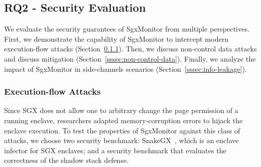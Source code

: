 \subsection{RQ2 - Security Evaluation}
\label{ssec:security-properties}

We evaluate the security guarantees of SgxMonitor from multiple 
perspectives.
First, we demonstrate the capability of SgxMonitor to intercept 
modern execution-flow attacks (Section~\ref{sssec:execution-flow-attacks}).
Then, we discuss non-control data attacks and discuss mitigation
(Section~\ref{sssec:non-control-data}).
Finally, we analyze the impact of SgxMonitor in side-channels scenarios 
(Section~\ref{sssec:info-leakage}).

\subsubsection{Execution-flow Attacks}
\label{sssec:execution-flow-attacks}

Since SGX does not allow one to arbitrary change the page permission of a 
running enclave, 
researchers adapted memory-corruption errors to hijack the enclave execution.
To test the properties of SgxMonitor against this class of attacks, we 
choose two security benchmark: \textsf{SnakeGX}~\citep{snakegx}, which is an 
enclave infector for SGX enclaves; and a security benchmark 
that evaluates the correctness of the shadow stack defense.


